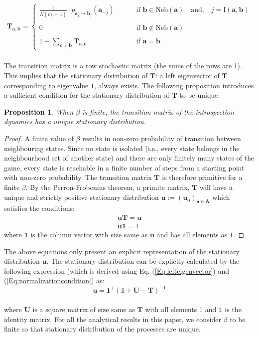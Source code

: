 \documentclass[11pt]{article}
\theoremstyle{plainCl1}
\newtheorem{Prop}{Proposition}
\theoremstyle{plainCl2}
\newcommand{\A}{\mathbf{A}}
\newcommand{\abf}{\mathbf{a}}
\newcommand{\bbf}{\mathbf{b}}
\newcommand{\cbf}{\mathbf{c}}
\newcommand{\T}{\mathbf{T}}
\newcommand{\ubf}{\mathbf{u}}
\begin{document}
\begin{align}
\T_{\abf, \bbf} = 
\begin{cases}
\frac{1}{N(m_j-1)}  \cdot p_{\abf_{j} \to \bbf_{j}} (\abf_{-j}) \quad  \quad &\text{ if }\bbf \in \mathrm{Neb}(\abf) \quad \text{and,} \quad j = \mathrm{I}(\abf,\bbf)\\ \\ 
0 \quad &\text{ if } \bbf \notin \mathrm{Neb}(\abf) \\ \\
1 - \sum_{\cbf \neq \bbf} \T_{\abf,\cbf} \quad &\text{ if } \abf = \bbf
\end{cases}
\label{Eq:transition-matrix}
\end{align} \\ 
\noindent The transition matrix is a row stochastic matrix (the sums of the rows are 1). This implies that the stationary distribution of $\T$: a left eigenvector of $\T$ corresponding to eigenvalue $1$, always exists. The following proposition introduces a sufficient condition for the stationary distribution of $\T$ to be unique. 
\begin{Prop} When $\beta$ is finite, the transition matrix of the introspection dynamics has a unique stationary distribution. 
\label{Prop:unique-stationary-dist}
\end{Prop}
\begin{proof}
A finite value of $\beta$ results in non-zero probability of transition between neighbouring states. Since no state is isolated (i.e., every state belongs in the neighbourhood set of another state) and there are only finitely many states of the game, every state is reachable in a finite number of steps from a starting point with non-zero probability. The transition matrix $\T$ is therefore primitive for a finite $\beta$. By the Perron-Frobenius theorem, a primite matrix, $\T$ will have a unique and strictly positive stationary distribution $\ubf := (\ubf_\abf)_{\abf \in \A}$ which satisfies the conditions: 
\begin{eqnarray}
\label{Eq:lefteigenvector}
\ubf \T = \ubf \\ 
\label{Eq:normalizationcondition}
\ubf \mathbf{1} = 1
\end{eqnarray}
\noindent where $\mathbf{1}$ is the column vector with size same as $\ubf$ and has all elements as $1$. 
\end{proof}
\noindent The above equations only present an explicit representation of the stationary distribution $\ubf$. The stationary distribution can be explictly calculated by the following expression (which is derived using Eq. (\ref{Eq:lefteigenvector}) and (\ref{Eq:normalizationcondition}) as:
\begin{equation}
\ubf = \mathbf{1}^\intercal (\mathbb{1} + \mathbf{U} - \T)^{-1}
\label{Eq:explicit-stationary-dist-representation}
\end{equation} \\
where $\mathbf{U}$ is a square matrix of size same as $\T$ with all elements 1 and $\mathbb{1}$ is the identity matrix. For all the analytical results in this paper, we consider $\beta$ to be finite so that stationary distribution of the processes are unique. \\
\end{document}
